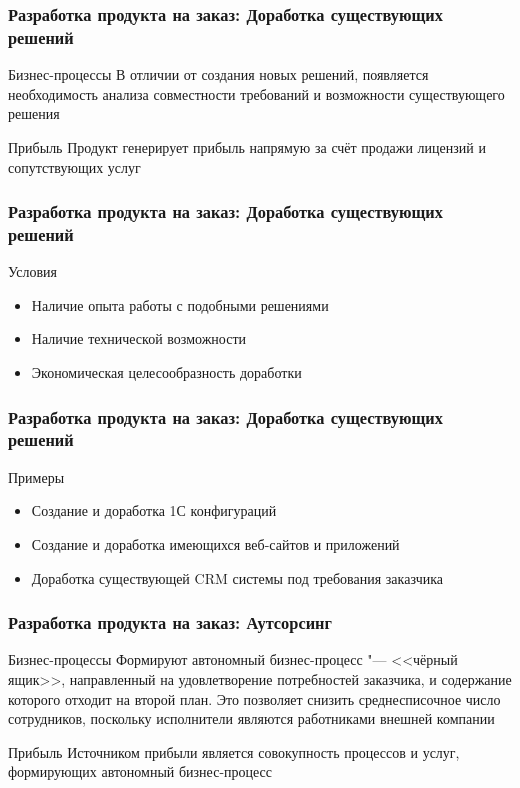 \documentclass{../industrial-development}
\begin{document}
\begin{frame} \frametitle{Разработка продукта на заказ: Доработка существующих решений}
	\begin{block}{Бизнес-процессы}
		В отличии от создания новых решений, появляется необходимость анализа совместности требований и возможности существующего решения
	\end{block}
	\begin{block}{Прибыль}
		Продукт генерирует прибыль напрямую за счёт продажи лицензий и сопутствующих услуг
	\end{block}
\end{frame}


\begin{frame} \frametitle{Разработка продукта на заказ: Доработка существующих решений}
	\begin{block}{Условия}
		\begin{itemize}
			\item Наличие опыта работы с подобными решениями
			\item Наличие технической возможности
			\item Экономическая целесообразность доработки
		\end{itemize}
	\end{block}
\end{frame}


\begin{frame} \frametitle{Разработка продукта на заказ: Доработка существующих решений}
	\begin{block}{Примеры}
		\begin{itemize}
			\item Создание и доработка 1С конфигураций
			\item Создание и доработка имеющихся веб-сайтов и приложений
			\item Доработка существующей CRM системы под требования заказчика
		\end{itemize}
	\end{block}
\end{frame}


\begin{frame} \frametitle{Разработка продукта на заказ: Аутсорсинг}
	\begin{block}{Бизнес-процессы}
		Формируют автономный бизнес-процесс "--- <<чёрный ящик>>, направленный на удовлетворение потребностей заказчика, и содержание которого отходит на второй план.
		Это позволяет снизить среднесписочное число сотрудников, поскольку исполнители являются работниками внешней компании
	\end{block}
	\begin{block}{Прибыль}
		Источником прибыли является совокупность процессов и услуг, формирующих автономный бизнес-процесс
	\end{block}
\end{frame}
\end{document}
